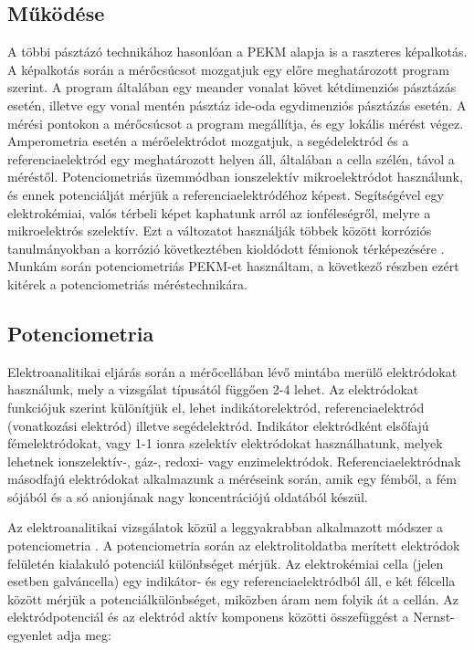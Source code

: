 \subsection{Működése}

A többi pásztázó technikához hasonlóan a PEKM alapja is a raszteres képalkotás. A képalkotás során a mérőcsúcsot mozgatjuk egy előre meghatározott program szerint. A program általában egy meander vonalat követ kétdimenziós pásztázás esetén, illetve egy vonal mentén pásztáz ide-oda egydimenziós pásztázás esetén. A mérési pontokon a mérőcsúcsot a program megállítja, és egy lokális mérést végez. Amperometria esetén a mérőelektródot mozgatjuk, a segédelektród és a referenciaelektród egy meghatározott helyen áll, általában a cella szélén, távol a méréstől. Potenciometriás üzemmódban ionszelektív mikroelektródot használunk, és ennek potenciálját mérjük a referenciaelektródéhoz képest. Segítségével egy elektrokémiai, valós térbeli képet kaphatunk arról az ionféleségről, melyre a mikroelektrós szelektív. Ezt a változatot használják többek között korróziós tanulmányokban a korrózió következtében kioldódott fémionok térképezésére \cite{bastos2010micropotentiometric, lamaka2008monitoring, karavai2010localized}. Munkám során potenciometriás PEKM-et használtam, a következő részben ezért kitérek a potenciometriás méréstechnikára.



\subsection{Potenciometria}

Elektroanalitikai eljárás során a mérőcellában lévő mintába merülő elektródokat használunk, mely a vizsgálat típusától függően 2-4 lehet. Az elektródokat funkciójuk szerint különítjük el, lehet indikátorelektród, referenciaelektród (vonatkozási elektród) illetve segédelektród. Indikátor elektródként elsőfajú fémelektródokat, vagy 1-1 ionra szelektív elektródokat használhatunk, melyek lehetnek ionszelektív-, gáz-, redoxi- vagy enzimelektródok. Referenciaelektródnak másodfajú elektródokat alkalmazunk a méréseink során, amik egy fémből, a fém sójából és a só anionjának nagy koncentrációjú oldatából készül.

Az elektroanalitikai vizsgálatok közül a leggyakrabban alkalmazott módszer a potenciometria \cite{erdey1967}. A potenciometria során az elektrolitoldatba merített elektródok felületén kialakuló potenciál különbséget mérjük. Az elektrokémiai cella (jelen esetben galváncella) egy indikátor- és egy referenciaelektródból áll, e két félcella között mérjük a potenciálkülönbséget, miközben áram nem folyik át a cellán. Az elektródpotenciál és az elektród aktív komponens közötti összefüggést a Nernst-egyenlet adja meg:

